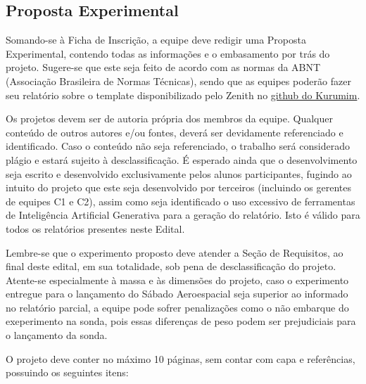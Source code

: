     \subsection{Proposta Experimental}\label{sec:proposta_experimental}
        Somando-se à Ficha de Inscrição, a equipe deve redigir uma Proposta Experimental, contendo todas as informações e o embasamento por trás do projeto. Sugere-se que este seja feito de acordo com as normas da ABNT (Associação Brasileira de Normas Técnicas), sendo que as equipes poderão fazer seu relatório sobre o template disponibilizado pelo Zenith no \href{https://github.com/zenitheesc/kurumim/tree/main/Relat%C3%B3rios}{\color{highcolor} github do Kurumim}.

        Os projetos devem ser de autoria própria dos membros da equipe. 
        Qualquer conteúdo de outros autores e/ou fontes, deverá ser devidamente referenciado e identificado. 
        Caso o conteúdo não seja referenciado, o trabalho será considerado plágio e estará sujeito à 
        desclassificação. É esperado ainda que o desenvolvimento seja escrito e desenvolvido exclusivamente 
        pelos alunos participantes, fugindo ao intuito do projeto que este seja desenvolvido por terceiros 
        (incluindo os gerentes de equipes C1 e C2), assim como seja identificado o uso excessivo de ferramentas
        de Inteligência Artificial Generativa para a geração do relatório. Isto é válido para todos os 
        relatórios presentes neste Edital.

        Lembre-se que o experimento proposto deve atender a Seção de Requisitos, ao final deste edital, 
        em sua totalidade, sob pena de desclassificação do projeto. Atente-se especialmente à massa e às 
        dimensões do projeto, caso o experimento entregue para o lançamento do Sábado Aeroespacial seja superior
        ao informado no relatório parcial, a equipe pode sofrer penalizações como o não embarque do exeperimento 
        na sonda, pois essas diferenças de peso podem ser prejudiciais para o lançamento da sonda.

        O projeto deve conter no máximo 10 páginas, sem contar com capa e referências, possuindo os seguintes itens:
        
